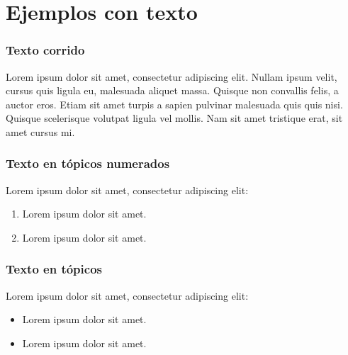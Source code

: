\section{Ejemplos con texto}


\begin{frame}
	\frametitle{Texto corrido}
    Lorem ipsum dolor sit amet, consectetur adipiscing elit. Nullam ipsum velit, cursus quis ligula eu, malesuada aliquet massa. Quisque non convallis felis, a auctor eros. Etiam sit amet turpis a sapien pulvinar malesuada quis quis nisi. Quisque scelerisque volutpat ligula vel mollis. Nam sit amet tristique erat, sit amet cursus mi. 
\end{frame}


\begin{frame}
	\frametitle{Texto en tópicos numerados}
     Lorem ipsum dolor sit amet, consectetur adipiscing elit:
    \begin{enumerate}
        \item Lorem ipsum dolor sit amet.
        \item Lorem ipsum dolor sit amet.
    \end{enumerate}
	
\end{frame}


\begin{frame}
	\frametitle{Texto en tópicos}
     Lorem ipsum dolor sit amet, consectetur adipiscing elit:
    \begin{itemize}
        \item Lorem ipsum dolor sit amet.
        \item Lorem ipsum dolor sit amet.
    \end{itemize}
	
\end{frame}


